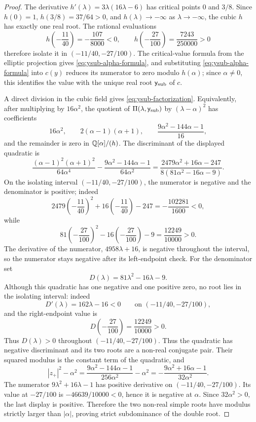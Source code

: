 \begin{proof}
The derivative \(h'(\lambda)=3\lambda(16\lambda-6)\) has critical points \(0\) and \(3/8\).
Since \(h(0)=1\), \(h(3/8)=37/64>0\), and \(h(\lambda)\to-\infty\) as \(\lambda\to-\infty\), the cubic \(h\) has exactly one real root.
The rational evaluations
\[
h\!\left(-\frac{11}{40}\right)=-\frac{107}{8000}<0,
\qquad
h\!\left(-\frac{27}{100}\right)=\frac{7243}{250000}>0
\]
therefore isolate it in \((-11/40,-27/100)\).
The critical-value formula from the elliptic projection gives \eqref{eq:ysub-alpha-formula}, and substituting \eqref{eq:ysub-alpha-formula} into \(c(y)\) reduces its numerator to zero modulo \(h(\alpha)\); since \(\alpha\ne0\), this identifies the value with the unique real root \(\mathsf{y}_{\mathrm{sub}}\) of \(c\).

A direct division in the cubic field gives \eqref{eq:ysub-factorization}.
Equivalently, after multiplying by \(16\alpha^2\), the quotient of \(\Pi(\lambda,\mathsf{y}_{\mathrm{sub}})\) by \((\lambda-\alpha)^2\) has coefficients
\[
16\alpha^2,
\qquad
2(\alpha-1)(\alpha+1),
\qquad
\frac{9\alpha^2-144\alpha-1}{16},
\]
and the remainder is zero in \(\mathbb{Q}[\alpha]/(h)\).
The discriminant of the displayed quadratic is
\[
\frac{(\alpha-1)^2(\alpha+1)^2}{64\alpha^4}
-\frac{9\alpha^2-144\alpha-1}{64\alpha^2}
=\frac{2479\alpha^2+16\alpha-247}{8(81\alpha^2-16\alpha-9)}.
\]
On the isolating interval \((-11/40,-27/100)\), the numerator is negative and the denominator is positive; indeed
\[
2479\left(-\frac{11}{40}\right)^2+16\left(-\frac{11}{40}\right)-247=-\frac{102281}{1600}<0,
\]
while
\[
81\left(-\frac{27}{100}\right)^2-16\left(-\frac{27}{100}\right)-9=\frac{12249}{10000}>0.
\]
The derivative of the numerator, \(4958\lambda+16\), is negative throughout the interval, so the numerator stays negative after its left-endpoint check.  For the denominator set
\[
D(\lambda)=81\lambda^2-16\lambda-9.
\]
Although this quadratic has one negative and one positive zero, no root lies in the isolating interval: indeed
\[
D'(\lambda)=162\lambda-16<0
\qquad\text{on }(-11/40,-27/100),
\]
and the right-endpoint value is
\[
D\!\left(-\frac{27}{100}\right)=\frac{12249}{10000}>0.
\]
Thus \(D(\lambda)>0\) throughout \((-11/40,-27/100)\).
Thus the quadratic has negative discriminant and its two roots are a non-real conjugate pair.
Their squared modulus is the constant term of the quadratic, and
\[
|z_{+}|^2-\alpha^2
=\frac{9\alpha^2-144\alpha-1}{256\alpha^2}-\alpha^2
=-\frac{9\alpha^2+16\alpha-1}{32\alpha^2}.
\]
The numerator \(9\lambda^2+16\lambda-1\) has positive derivative on \((-11/40,-27/100)\).
Its value at \(-27/100\) is \(-46639/10000<0\), hence it is negative at \(\alpha\).
Since \(32\alpha^2>0\), the last display is positive.
Therefore the two non-real simple roots have modulus strictly larger than \(|\alpha|\), proving strict subdominance of the double root.
\end{proof}


